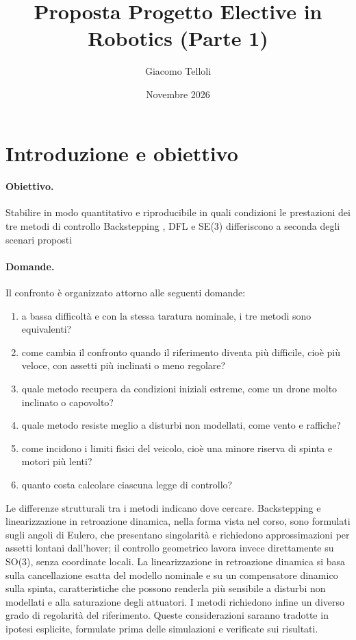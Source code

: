 \documentclass[11pt,a4paper]{article}
\title{Proposta Progetto Elective in Robotics (Parte 1)}
\author{Giacomo Telloli\\[0.2em]}
\date{Novembre 2026}
\begin{document}
\maketitle
\section{Introduzione e obiettivo}

\paragraph{Obiettivo.} Stabilire in modo quantitativo e riproducibile in quali condizioni le prestazioni dei tre metodi di controllo Backstepping , DFL e SE(3) differiscono a seconda degli scenari proposti

\paragraph{Domande.} Il confronto è organizzato attorno alle seguenti domande:
\begin{enumerate}
  \item a bassa difficoltà e con la stessa taratura nominale, i tre metodi sono equivalenti?
  \item come cambia il confronto quando il riferimento diventa più difficile, cioè più veloce, con assetti più inclinati o meno regolare?
  \item quale metodo recupera da condizioni iniziali estreme, come un drone molto inclinato o capovolto?
  \item quale metodo resiste meglio a disturbi non modellati, come vento e raffiche?
  \item come incidono i limiti fisici del veicolo, cioè una minore riserva di spinta e motori più lenti?
  \item quanto costa calcolare ciascuna legge di controllo?
\end{enumerate}

Le differenze strutturali tra i metodi indicano dove cercare. Backstepping e linearizzazione in retroazione dinamica, nella forma vista nel corso, sono formulati sugli angoli di Eulero, che presentano singolarità e richiedono approssimazioni per assetti lontani dall'hover; il controllo geometrico lavora invece direttamente su SO(3), senza coordinate locali. La linearizzazione in retroazione dinamica si basa sulla cancellazione esatta del modello nominale e su un compensatore dinamico sulla spinta, caratteristiche che possono renderla più sensibile a disturbi non modellati e alla saturazione degli attuatori. I metodi richiedono infine un diverso grado di regolarità del riferimento. Queste considerazioni saranno tradotte in ipotesi esplicite, formulate prima delle simulazioni e verificate sui risultati.
\end{document}
